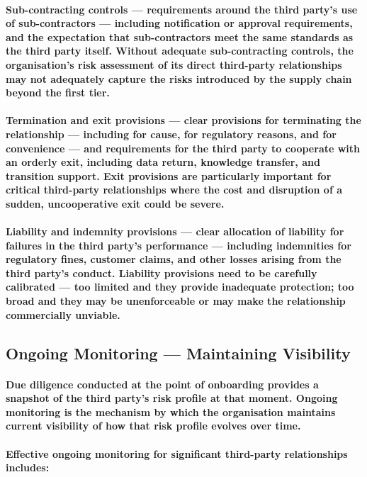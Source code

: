 \paragraph{\textbf{Sub-contracting controls} — requirements around the third party's use of sub-contractors — including notification or approval requirements, and the expectation that sub-contractors meet the same standards as the third party itself. Without adequate sub-contracting controls, the organisation's risk assessment of its direct third-party relationships may not adequately capture the risks introduced by the supply chain beyond the first tier.}
\paragraph{\textbf{Termination and exit provisions} — clear provisions for terminating the relationship — including for cause, for regulatory reasons, and for convenience — and requirements for the third party to cooperate with an orderly exit, including data return, knowledge transfer, and transition support. Exit provisions are particularly important for critical third-party relationships where the cost and disruption of a sudden, uncooperative exit could be severe.}
\paragraph{\textbf{Liability and indemnity provisions} — clear allocation of liability for failures in the third party's performance — including indemnities for regulatory fines, customer claims, and other losses arising from the third party's conduct. Liability provisions need to be carefully calibrated — too limited and they provide inadequate protection; too broad and they may be unenforceable or may make the relationship commercially unviable.}

\subsection{Ongoing Monitoring — Maintaining Visibility}
\paragraph{Due diligence conducted at the point of onboarding provides a snapshot of the third party's risk profile at that moment. Ongoing monitoring is the mechanism by which the organisation maintains current visibility of how that risk profile evolves over time.}
\paragraph{Effective ongoing monitoring for significant third-party relationships includes:}
